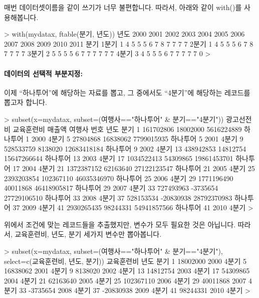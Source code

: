 \documentclass[tutorial.tex]{subfiles}
\begin{document}
매번 데이터셋이름을 같이 쓰기가 너무 불편합니다.
따라서, 아래와 같이 with()를 사용해봅니다.

\begin{Schunk}
\begin{Soutput}
> with(mydatax, ftable(분기, 년도))
      년도 2000 2001 2002 2003 2004 2005 2006 2007 2008 2009 2010 2011
분기                                                                  
1분기         1    4    5    5    5    6    7    8    7    7    7    7
2분기         1    4    5    5    5    6    7    8    7    7    7    7
3분기         2    5    5    5    5    6    7    7    7    7    7    7
4분기         3    4    5    5    5    6    7    7    7    7    7    0
> 
\end{Soutput}
\end{Schunk}


\paragraph{데이터의 선택적 부분지정:}
이제 ``하나투어''에 해당하는 자료를 뽑고, 그 중에서도 ``4분기''에 해당하는 레코드를 뽑고자 합니다.

\begin{Schunk}
\begin{Soutput}
> subset(x=mydatax, subset=(여행사=="하나투어" & 분기=="4분기"))
   광고선전비 교육훈련비      매출액   여행사 번호 년도  분기
1   161702806   18002000  5616224889 하나투어    1 2000 4분기
5    27804868   16838062  7799015935 하나투어    5 2001 4분기
9   528533759    8138020 12683418184 하나투어    9 2002 4분기
13  438942853   14812754 15647266644 하나투어   13 2003 4분기
17 1034522413   54309865 19861453701 하나투어   17 2004 4분기
21 1372387152   62163640 27122123547 하나투어   21 2005 4분기
25 2393203854  102367110 46035346970 하나투어   25 2006 4분기
29 1771196490   40011868 46418905817 하나투어   29 2007 4분기
33  727493963   -3735654 27729106510 하나투어   33 2008 4분기
37  528153534  -20830938 28792370983 하나투어   37 2009 4분기
41 2930265435   98244331 54941857566 하나투어   41 2010 4분기
> 
\end{Soutput}
\end{Schunk}


위에서 조건에 맞는 레코드들을 추출했지만, 변수가 모두 필요한 것은 아닙니다.
따라서, 교육훈련비, 년도, 분기 세가지 변수만 뽑아봅니다.

\begin{Schunk}
\begin{Soutput}
> subset(x=mydatax, subset=(여행사=="하나투어" & 분기=="4분기"), select=c(교육훈련비, 년도, 분기))
   교육훈련비 년도  분기
1    18002000 2000 4분기
5    16838062 2001 4분기
9     8138020 2002 4분기
13   14812754 2003 4분기
17   54309865 2004 4분기
21   62163640 2005 4분기
25  102367110 2006 4분기
29   40011868 2007 4분기
33   -3735654 2008 4분기
37  -20830938 2009 4분기
41   98244331 2010 4분기
> 
\end{Soutput}
\end{Schunk}
\end{document}
